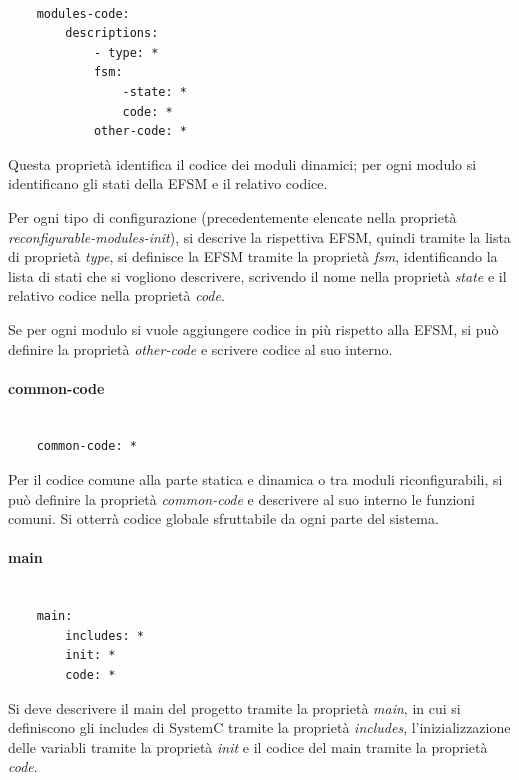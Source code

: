 \documentclass[a4paper,titlepage]{book}
\begin{document}
\begin{lstlisting}[frame=single]

	modules-code:
		descriptions:
			- type: *
			fsm:
				-state: *
				code: *
			other-code: *

\end{lstlisting}

Questa proprietà identifica il codice dei moduli dinamici; per ogni modulo si identificano gli stati della EFSM e il relativo codice.

Per ogni tipo di configurazione (precedentemente elencate nella proprietà \textit{reconfigurable-modules-init}), si descrive la rispettiva EFSM, quindi tramite la lista di proprietà \textit{type}, si definisce la EFSM tramite la proprietà \textit{fsm}, identificando la lista di stati che si vogliono descrivere, scrivendo il nome nella proprietà \textit{state} e il relativo codice nella proprietà \textit{code}.

Se per ogni modulo si vuole aggiungere codice in più rispetto alla EFSM, si può definire la proprietà \textit{other-code} e scrivere codice al suo interno.


\paragraph{common-code}

\begin{lstlisting}[frame=single]

	common-code: *

\end{lstlisting}

Per il codice comune alla parte statica e dinamica o tra moduli riconfigurabili, si può definire la proprietà \textit{common-code} e descrivere al suo interno le funzioni comuni. Si otterrà codice globale sfruttabile da ogni parte del sistema.


\paragraph{main}

\begin{lstlisting}[frame=single]

	main:
		includes: *
		init: *
		code: *

\end{lstlisting}


Si deve descrivere il main del progetto tramite la proprietà \textit{main}, in cui si definiscono gli includes di SystemC tramite la proprietà \textit{includes}, l'inizializzazione delle variabli tramite la proprietà \textit{init} e il codice del main tramite la proprietà \textit{code}.
\end{document}
